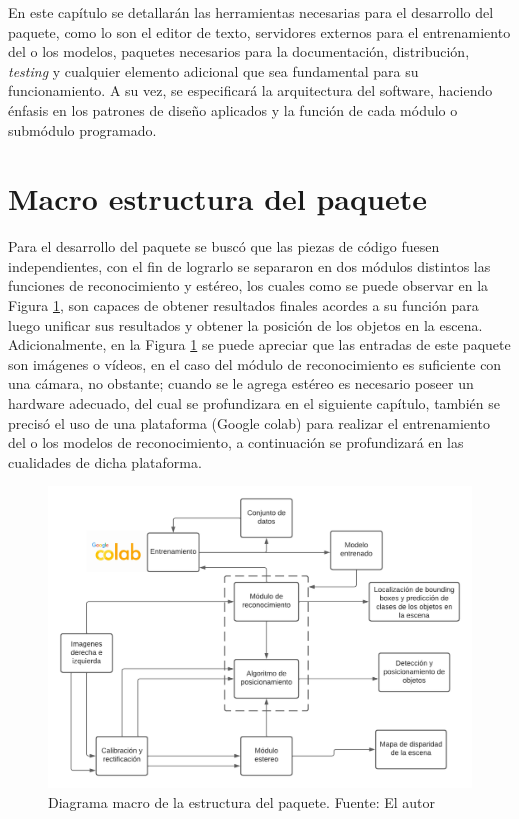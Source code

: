 En este capítulo se detallarán las herramientas necesarias para el desarrollo del paquete, como lo son el editor de texto, servidores externos para el entrenamiento del o los modelos, paquetes necesarios para la documentación, distribución, \textit{testing} y cualquier elemento adicional que sea fundamental para su funcionamiento. A su vez, se especificará la arquitectura del software, haciendo énfasis en los patrones de diseño aplicados y la función de cada módulo o submódulo programado.
\section{Macro estructura del paquete}
Para el desarrollo del paquete se buscó que las piezas de código fuesen independientes, con el fin de lograrlo se separaron en dos módulos distintos las funciones de reconocimiento y estéreo, los cuales como se puede observar en la Figura \ref{modos_func_paquete}, son capaces de obtener resultados finales acordes a su función para luego unificar sus resultados y obtener la posición de los objetos en la escena. Adicionalmente, en la Figura \ref{modos_func_paquete} se puede apreciar que las entradas de este paquete son imágenes o vídeos, en el caso del módulo de reconocimiento es suficiente con una cámara, no obstante; cuando se le agrega estéreo es necesario poseer un hardware adecuado, del cual se profundizara en el siguiente capítulo, también se precisó el uso de una plataforma (Google colab) para realizar el entrenamiento del o los modelos de reconocimiento, a continuación se profundizará en las cualidades de dicha plataforma.
\begin{figure}[H]
    \centering
    \includegraphics[scale=0.5]{Recursos/modos_func_paquete.png}
    \caption[Diagrama macro de la estructura del paquete.]{Diagrama macro de la estructura del paquete. {\footnotesize Fuente: El autor}}
    \label{modos_func_paquete}
\end{figure}
